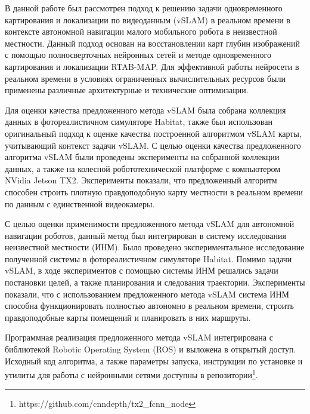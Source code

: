 \documentclass{mipt-thesis-ms}
\begin{document}
	В данной работе был рассмотрен подход к решению задачи одновременного картирования и локализации по видеоданным (vSLAM) в реальном времени в контексте автономной навигации малого мобильного робота в неизвестной местности. Данный подход основан на восстановлении карт глубин изображений с помощью полносверточных нейронных сетей и методе одновременного картирования и локализации RTAB-MAP. Для эффективной работы нейросети в реальном времени в условиях ограниченных вычислительных ресурсов были применены различные архитектурные и технические оптимизации.
	
	Для оценки качества предложенного метода vSLAM была собрана коллекция данных в фотореалистичном симуляторе Habitat, также был использован оригинальный подход к оценке качества построенной алгоритмом vSLAM карты, учитывающий контекст задачи vSLAM. С целью оценки качества предложенного алгоритма vSLAM были проведены эксперименты на собранной коллекции данных, а также на колесной робототехнической платформе с компьютером NVidia Jetson TX2. Эксперименты показали, что предложенный алгоритм способен строить плотную правдоподобную карту местности в реальном времени по данным с единственной видеокамеры.
	
	С целью оценки применимости предложенного метода vSLAM для автономной навигации роботов, данный метод был интегрирован в систему исследования неизвестной местности (ИНМ). Было проведено экспериментальное исследование полученной системы в фотореалистичном симуляторе Habitat. Помимо задачи vSLAM, в ходе экспериментов с помощью системы ИНМ решались задачи постановки целей, а также планирования и следования траектории. Эксперименты показали, что с использованием предложенного метода vSLAM система ИНМ способна функционировать полностью автономно в реальном времени, строить правдоподобные карты помещений и планировать в них маршруты.
	
	Программная реализация предложенного метода vSLAM интегрирована с библиотекой Robotic Operating System (ROS) и выложена в открытый доступ. Исходный код алгоритма, а также параметры запуска, инструкции по установке и утилиты для работы с нейронными сетями доступны в репозитории\footnote{https://github.com/cnndepth/tx2\_fcnn\_node}.
	 
	\printbibliography
\end{document}

